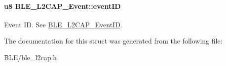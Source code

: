 \paragraph[{\texorpdfstring{event\+ID}{eventID}}]{\setlength{\rightskip}{0pt plus 5cm}u8 B\+L\+E\+\_\+\+L2\+C\+A\+P\+\_\+\+Event\+::event\+ID}\hypertarget{struct_b_l_e___l2_c_a_p___event_a6fa06e18d5adc7940a124cf09f865eda}{}\label{struct_b_l_e___l2_c_a_p___event_a6fa06e18d5adc7940a124cf09f865eda}
Event ID. See \hyperlink{group___b_l_e___l2_c_a_p_gab22309c032161491ea67caafd08d5535}{B\+L\+E\+\_\+\+L2\+C\+A\+P\+\_\+\+Event\+ID}. 

The documentation for this struct was generated from the following file\+:\begin{DoxyCompactItemize}
\item 
B\+L\+E/ble\+\_\+l2cap.\+h\end{DoxyCompactItemize}
